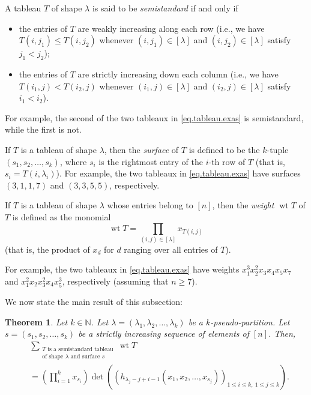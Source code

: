 \documentclass[reqno]{amsart}
\newcommand{\0}{\phantom{c}}
\let\sumnonlimits\sum
\let\prodnonlimits\prod
\renewcommand{\sum}{\sumnonlimits\limits}
\renewcommand{\prod}{\prodnonlimits\limits}
\newcommand{\defn}[1]{{\color{darkred}\emph{#1}}} %
\theoremstyle{plain}
\newtheorem{thm}{Theorem}[section]
\theoremstyle{definition}
\numberwithin{equation}{section}
\begin{document}
A tableau $T$ of shape $\lambda$ is said to be \defn{semistandard} if and only if

\begin{itemize}
\item the entries of $T$ are weakly increasing along each row (i.e., we have
$T\left(  i,j_{1}\right)  \leq T\left(  i,j_{2}\right)  $ whenever $\left(
i,j_{1}\right)  \in\left[  \lambda\right]  $ and $\left(  i,j_{2}\right)
\in\left[  \lambda\right]  $ satisfy $j_{1}<j_{2}$);

\item the entries of $T$ are strictly increasing down each column (i.e., we
have $T\left(  i_{1},j\right)  <T\left(  i_{2},j\right)  $ whenever $\left(
i_{1},j\right)  \in\left[  \lambda\right]  $ and $\left(  i_{2},j\right)
\in\left[  \lambda\right]  $ satisfy $i_{1}<i_{2}$).
\end{itemize}

For example, the second of the two tableaux in \eqref{eq.tableau.exas} is
semistandard, while the first is not.

If $T$ is a tableau of shape $\lambda$, then the \defn{surface} of $T$ is
defined to be the $k$-tuple $\left(  s_{1},s_{2},\ldots,s_{k}\right)  $, where
$s_{i}$ is the rightmost entry of the $i$-th row of $T$ (that is,
$s_{i}=T\left(  i,\lambda_{i}\right)  $). For example, the two tableaux in
\eqref{eq.tableau.exas} have surfaces $\left(  3,1,1,7\right)  $ and $\left(
3,3,5,5\right)  $, respectively.

If $T$ is a tableau of shape $\lambda$ whose entries belong to $\left[
n\right]  $, then the \defn{weight $\operatorname{wt} T$} of $T$ is defined as
the monomial%
\[
\operatorname*{wt}T=\prod_{\left(  i,j\right)  \in\left[  \lambda\right]
}x_{T\left(  i,j\right)  }%
\]
(that is, the product of $x_{d}$ for $d$ ranging over all entries of $T$).

For example, the two tableaux in \eqref{eq.tableau.exas} have weights
$x_{1}^{3}x_{2}^{2}x_{3}x_{4}x_{5}x_{7}$ and $x_{1}^{2}x_{2}x_{3}^{2}%
x_{4}x_{5}^{3}$, respectively (assuming that $n\geq7$).

We now state the main result of this subsection:

\begin{thm}
\label{thm.tableau.jt}Let $k\in\mathbb{N}$. Let $\lambda=\left(  \lambda
_{1},\lambda_{2},\ldots,\lambda_{k}\right)  $ be a $k$-pseudo-partition. Let
$s=\left(  s_{1},s_{2},\ldots,s_{k}\right)  $ be a strictly increasing
sequence of elements of $\left[  n\right]  $. Then,%
\begin{align*}
&  \sum_{\substack{T\text{ is a semistandard tableau}\\\text{of shape }%
\lambda\text{ and surface }s}}\operatorname*{wt}T\\
&  =\left(  \prod_{i=1}^{k}x_{s_{i}}\right)  \det\left(  \left(
h_{\lambda_{j}-j+i-1}\left(  x_{1},x_{2},\ldots,x_{s_{j}}\right)  \right)
_{1\leq i\leq k,\ 1\leq j\leq k}\right)  .
\end{align*}

\end{thm}
\end{document}
